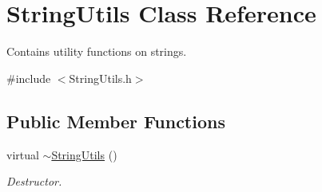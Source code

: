 \hypertarget{classStringUtils}{\section{String\-Utils Class Reference}
\label{classStringUtils}
}


Contains utility functions on strings.  




{\ttfamily \#include $<$String\-Utils.\-h$>$}

\subsection*{Public Member Functions}
\begin{DoxyCompactItemize}
\item 
virtual \hyperlink{classStringUtils_adcd5c42b8e47a0401a91ea822fff037f}{$\sim$\-String\-Utils} ()
\begin{DoxyCompactList}\small\item\em Destructor. \end{DoxyCompactList}\end{DoxyCompactItemize}
